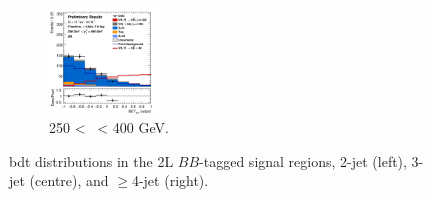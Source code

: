 \begin{figure}[h!]
\begin{subfigure}[b]{\textwidth}
        \includegraphics[width=0.32\textwidth]{Images/VH/Own_fit/postfit_VHbb/Region_distmva_BMax400_BMin250_DSR_J4_TTypebb_incJet1_T2_L2_Y6051_GlobalFit_conditionnal_mu1.png}
        \caption{250 < \ptv\ < 400 GeV.}
        \label{fig:plots_VHbb_2L_250_SR}
    \end{subfigure}
    \caption{\gls{bdt} distributions in the 2L $BB$-tagged signal regions, 2-jet (left), 3-jet (centre), and $\geq$4-jet (right).}
     \label{fig:plots_VHbb_2L_SR}
\end{figure} 

\vspace*{\fill}\clearpage
\vspace*{\fill}

